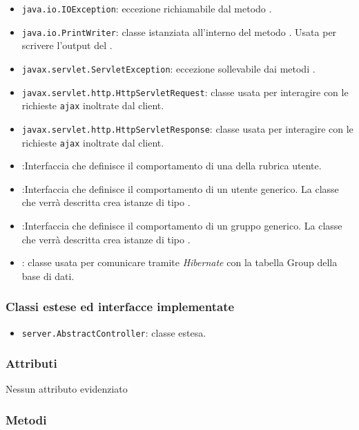 \begin{itemize}
	\item \texttt{java.io.IOException}: eccezione richiamabile dal metodo .
	\item \texttt{java.io.PrintWriter}: classe istanziata all'interno del metodo . Usata per scrivere l'output del .
	\item \texttt{javax.servlet.ServletException}: eccezione sollevabile dai metodi .
	\item \texttt{javax.servlet.http.HttpServletRequest}: classe usata per interagire con le richieste \texttt{ajax} inoltrate dal client.
	\item \texttt{javax.servlet.http.HttpServletResponse}: classe usata per interagire con le richieste \texttt{ajax} inoltrate dal client.
	\item {}:Interfaccia che definisce il comportamento di una  della rubrica utente.
	\item {}:Interfaccia che definisce il comportamento di un utente generico. La classe che verrà descritta crea istanze di tipo .
		\item {}:Interfaccia che definisce il comportamento di un gruppo generico. La classe che verrà descritta crea istanze di tipo .
	\item {}: classe usata per comunicare tramite \textit{Hibernate} con la tabella Group della base di dati.
\end{itemize}

\subsubsection*{Classi estese ed interfacce implementate}
\begin{itemize}
	\item \texttt{server.AbstractController}: classe estesa.
\end{itemize}

\subsubsection*{Attributi}

Nessun attributo evidenziato

\subsubsection*{Metodi}

